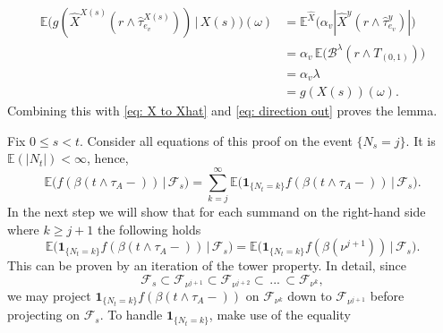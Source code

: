 \documentclass[11pt]{article}
\makeatletter
\renewenvironment{proof}[1][\proofname]{
   \par\pushQED{\qed}\normalfont
   \topsep6\p@\@plus6\p@\relax
   \trivlist\item[\hskip\labelsep\bfseries#1\@addpunct{.}]
   \ignorespaces
}{
   \popQED\endtrivlist\@endpefalse
}
\numberwithin{equation}{section}
\def\Ex{\mathbb{E}}
\def\indicator{\boldsymbol{1}}
\makeatother
\begin{document}
\begin{proof}[Proof of Lemma \ref{L: harmonic on cross}]
\begin{equation}
\begin{split}
      \Ex \big( g( \hat{X}^{X(s)}(
                r \land \hat{\tau}^{X(s)}_{e_v})) 
                \,\big|\, X(s) \big)(\omega)
    &= \Ex^{\hat{X}} \big( \alpha_v |\hat{X}^{y}(
          r \land \hat{\tau}^{y}_{e_v})| \big)\\
    &= \alpha_v \, \Ex \big( \mathcal{B}^{\lambda} 
                            (r \land T_{(0,1)})
                            \big)\\
    &= \alpha_v \lambda\\
    & = g(X(s)) (\omega).
    \end{split}
  \end{equation}  
  Combining this with \eqref{eq: X to Xhat} and 
  \eqref{eq: direction out} proves the lemma.
\end{proof}


\begin{proof}[Proof of Lemma \ref{L:remains to consider the first cross motion}]
  Fix $0 \leq s < t$.  
  Consider all equations of this proof on the event $\{N_s = j\}$.
  It is $\Ex(|N_t|) < \infty$, hence,   
  \begin{equation} \nonumber
    \Ex \big( f(\beta(t \land \tau_A -)) \,\big|\, 
    \mathcal{F}_s \big)
    = \sum_{k=j}^{\infty} 
    \Ex \big( \indicator_{\{N_t= k\}} 
      f(\beta(t \land \tau_A -)) 
    \,\big|\, 
      \mathcal{F}_s \big).
  \end{equation} 
  In the next step we will show
  that for each summand on the right-hand side  
  where $k \geq j+1$ the following holds
  \begin{equation}\label{eq: summand for k > j}
      \Ex \big( \indicator_{\{N_t= k\}} 
      f(\beta(t \land \tau_A -)) 
    \,\big|\, 
    \mathcal{F}_s \big) 
    = 
    \Ex \big( \indicator_{\{N_t= k\}} 
    f(\beta( \nu^{j+1})) 
    \,\big|\, 
    \mathcal{F}_s \big).
  \end{equation}
  This can be proven by an iteration of the tower property. 
  In detail, since 
  \begin{equation}\nonumber
    \mathcal{F}_s \subset \mathcal{F}_{\nu^{j+1}}
                \subset \mathcal{F}_{\nu^{j+2}}
                \subset \,...\,
                \subset \mathcal{F}_{\nu^k},
  \end{equation}
  we may project 
  $\indicator_{\{N_t= k\}} f(\beta(t \land \tau_A-))$ 
  on $\mathcal{F}_{\nu^k}$ down to $\mathcal{F}_{\nu^{j+1}}$
  before projecting on $\mathcal{F}_s$. 
  To handle $\indicator_{\{N_t = k\}}$, make use of the equality
  \begin{equation} \nonumber

\end{equation}
\end{proof}
\end{document}
